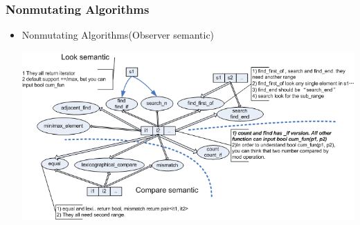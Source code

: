 \documentclass[a4paper,11pt,twoside]{book}
\begin{document}
\subsubsection{Nonmutating Algorithms}
\begin{itemize}
	\item Nonmutating Algorithms(Observer semantic)
	\begin{center}
		\includegraphics[width=1.0\linewidth]{pics/stl1.png}
	\end{center}
	
\end{itemize}
\end{document}
